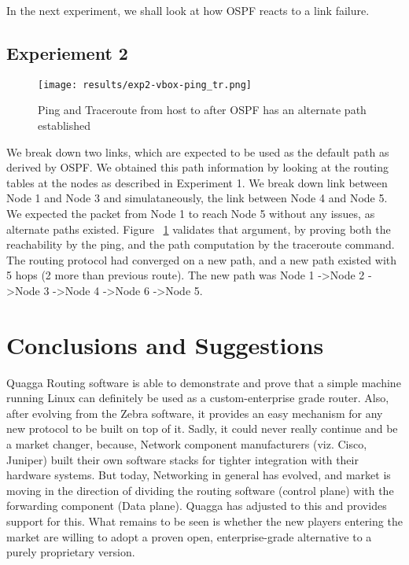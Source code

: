 \documentclass{article}
\begin{document}
In the next experiment, we shall look at how OSPF reacts to a link failure.\\
\subsection{Experiement 2}
\begin{figure}[ht!]
  \centering
  \texttt{[image: results/exp2-vbox-ping\_tr.png]}
  \caption{Ping and Traceroute from host to after OSPF has an alternate path established}
  \label{fig:exp2-vbox-ping_tr}
\end{figure}
We break down two links, which are expected to be used as the default path as derived by OSPF.
We obtained this path information by looking at the routing tables at the nodes as described in 
Experiment 1. We break down link between Node 1 and Node 3 and simulataneously, the link between 
Node 4 and Node 5. We expected the packet from Node 1 to reach Node 5 without any issues, as 
alternate paths existed. Figure~ \ref{fig:exp2-vbox-ping_tr} validates that argument, by proving
both the reachability by the ping, and the path computation by the traceroute command.
The routing protocol had converged on a new path, and a new path existed with 5 hops (2 more than
previous route). The new path was Node 1 -\textgreater  Node 2 -\textgreater Node 3 -\textgreater Node 4 -\textgreater Node 6 -\textgreater Node 5.\\


\clearpage
\section{Conclusions and Suggestions}
Quagga Routing software is able to demonstrate and prove that a simple machine running 
Linux can definitely be used as a custom-enterprise grade router. Also, after evolving 
from the Zebra software, it provides an easy mechanism for any new protocol to be built 
on top of it. Sadly, it could never really continue and be a market changer, because, 
Network component manufacturers (viz. Cisco, Juniper) built their own software stacks for 
tighter integration with their hardware systems. But today, Networking in general has 
evolved, and market is moving in the direction of dividing the routing software (control plane) 
with the forwarding component (Data plane). Quagga has adjusted to this and provides 
support for this. What remains to be seen is whether the new players entering the market 
are willing to adopt a proven open, enterprise-grade alternative to a purely proprietary version.
\clearpage
%
%
\end{document}
